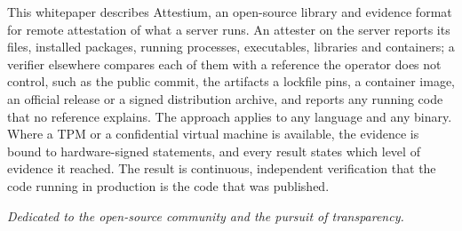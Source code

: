 {\begin{titlepage}
\begin{flushleft}
  This whitepaper describes Attestium, an open-source library and evidence format for remote attestation of what a server runs. An attester on the server reports its files, installed packages, running processes, executables, libraries and containers; a verifier elsewhere compares each of them with a reference the operator does not control, such as the public commit, the artifacts a lockfile pins, a container image, an official release or a signed distribution archive, and reports any running code that no reference explains. The approach applies to any language and any binary. Where a TPM or a confidential virtual machine is available, the evidence is bound to hardware-signed statements, and every result states which level of evidence it reached. The result is continuous, independent verification that the code running in production is the code that was published.
  \end{flushleft}

  \vfill

  {\fontsize{8}{10}\selectfont \textit{Dedicated to the open-source community and the pursuit of transparency.}\par}

  \end{titlepage}
}
